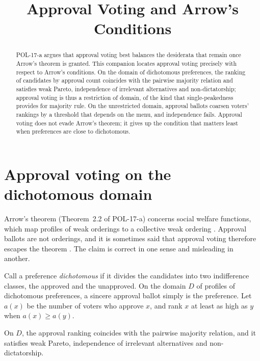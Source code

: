 \documentclass{situationist-preprint}
\title{Approval Voting and Arrow's Conditions}
\begin{document}
\maketitle

\begin{abstract}
POL-17-a argues that approval voting best balances the desiderata that remain once Arrow's theorem is granted. This companion locates approval voting precisely with respect to Arrow's conditions. On the domain of dichotomous preferences, the ranking of candidates by approval count coincides with the pairwise majority relation and satisfies weak Pareto, independence of irrelevant alternatives and non-dictatorship; approval voting is thus a restriction of domain, of the kind that single-peakedness provides for majority rule. On the unrestricted domain, approval ballots coarsen voters' rankings by a threshold that depends on the menu, and independence fails. Approval voting does not evade Arrow's theorem; it gives up the condition that matters least when preferences are close to dichotomous.
\end{abstract}

\section{Approval voting on the dichotomous domain}

Arrow's theorem (Theorem~2.2 of POL-17-a) concerns social welfare functions, which map profiles of weak orderings to a collective weak ordering \citep{Arrow1951}. Approval ballots are not orderings, and it is sometimes said that approval voting therefore escapes the theorem \citep{BramsFishburn1978}. The claim is correct in one sense and misleading in another.

Call a preference \emph{dichotomous} if it divides the candidates into two indifference classes, the approved and the unapproved. On the domain $D$ of profiles of dichotomous preferences, a sincere approval ballot simply is the preference. Let $a(x)$ be the number of voters who approve $x$, and rank $x$ at least as high as $y$ when $a(x) \geq a(y)$.

\begin{proposition}\label{p:dichotomous}
On $D$, the approval ranking coincides with the pairwise majority relation, and it satisfies weak Pareto, independence of irrelevant alternatives and non-dictatorship.
\end{proposition}
\end{document}
